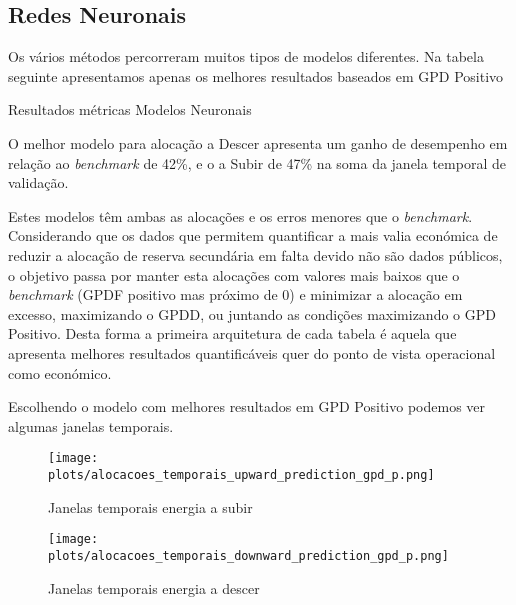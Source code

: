 \subsection{Redes Neuronais \label{se:resml}}

Os vários métodos percorreram muitos tipos de modelos diferentes. Na tabela seguinte apresentamos apenas os melhores resultados baseados em GPD Positivo\par


\begin{table}[H]
    \caption{Resultados métricas Modelos Neuronais}    
    \resizebox{\linewidth}{!}{}
    \label{tab:mlresmetrics}
    \end{table}

O melhor modelo para alocação a Descer apresenta um ganho de desempenho em relação ao \textit{benchmark} de 42\%, e o a Subir de 47\% na soma da janela temporal de validação.\par
Estes modelos têm ambas as alocações e os erros menores que o \textit{benchmark}. Considerando que os dados que permitem quantificar a mais valia económica de reduzir a alocação de reserva secundária em falta devido não são dados públicos, o objetivo passa por manter esta alocações com valores mais baixos que o \textit{benchmark} (GPDF positivo mas próximo de 0) e minimizar a alocação em excesso, maximizando o GPDD, ou juntando as condições maximizando o GPD Positivo. Desta forma a primeira arquitetura de cada tabela é aquela que apresenta melhores resultados quantificáveis quer do ponto de vista operacional como económico.\par
Escolhendo o modelo com melhores resultados em GPD Positivo podemos ver algumas janelas temporais.\par


\begin{figure}[H]
    \centering
    \texttt{[image: plots/alocacoes\_temporais\_upward\_prediction\_gpd\_p.png]}
    \caption{Janelas temporais energia a subir}
    \label{fig:mltimewindowsup}
\end{figure}


\begin{figure}[H]
    \centering
    \texttt{[image: plots/alocacoes\_temporais\_downward\_prediction\_gpd\_p.png]}
    \caption{Janelas temporais energia a descer}
    \label{fig:mltimewindowsdown}
\end{figure}

